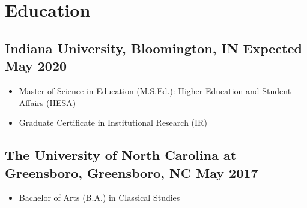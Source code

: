 \documentclass{article}
\begin{document}
\renewcommand{\headrulewidth}{0pt}

\hspace{0.10in}
\section*{Education\hrulefill} 

\subsection*{Indiana University, Bloomington, IN \hfill \textnormal{ Expected May 2020}}
\begin{itemize}
\item Master of Science in Education (M.S.Ed.): Higher Education and  Student Affairs (HESA)
\item Graduate Certificate in Institutional Research (IR)
\end{itemize}

\subsection*{The University of North Carolina at Greensboro, Greensboro, NC
  \hfill \textnormal{ May 2017}}
\begin{itemize}
\item Bachelor of Arts (B.A.) in Classical Studies
\end{itemize}
\end{document}
